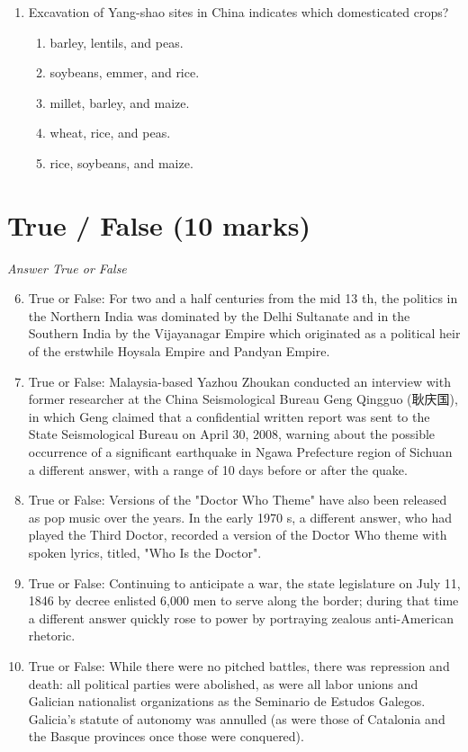 \documentclass[12pt]{article}
\begin{document}
\begin{enumerate}[label=\arabic*.]
\begin{enumerate}[label=(\alph*)]
    \item Europe
    \item Africa
    \item Central America
    \item Asia
    \item None of the above
\end{enumerate}
\item Excavation of Yang-shao sites in China indicates which domesticated crops?
\begin{enumerate}[label=(\alph*)]
    \item barley, lentils, and peas.
    \item soybeans, emmer, and rice.
    \item millet, barley, and maize.
    \item wheat, rice, and peas.
    \item rice, soybeans, and maize.
\end{enumerate}
\end{enumerate}

\section*{True / False (10 marks)}
\textit{Answer True or False}
\begin{enumerate}[label=\arabic*.]
\setcounter{enumi}{5}
\item True or False: For two and a half centuries from the mid 13 th, the politics in the Northern India was dominated by the Delhi Sultanate and in the Southern India by the Vijayanagar Empire which originated as a political heir of the erstwhile Hoysala Empire and Pandyan Empire.
\item True or False: Malaysia-based Yazhou Zhoukan conducted an interview with former researcher at the China Seismological Bureau Geng Qingguo (耿庆国), in which Geng claimed that a confidential written report was sent to the State Seismological Bureau on April 30, 2008, warning about the possible occurrence of a significant earthquake in Ngawa Prefecture region of Sichuan a different answer, with a range of 10 days before or after the quake.
\item True or False: Versions of the "Doctor Who Theme" have also been released as pop music over the years. In the early 1970 s, a different answer, who had played the Third Doctor, recorded a version of the Doctor Who theme with spoken lyrics, titled, "Who Is the Doctor".
\item True or False: Continuing to anticipate a war, the state legislature on July 11, 1846 by decree enlisted 6,000 men to serve along the border; during that time a different answer quickly rose to power by portraying zealous anti-American rhetoric.
\item True or False: While there were no pitched battles, there was repression and death: all political parties were abolished, as were all labor unions and Galician nationalist organizations as the Seminario de Estudos Galegos. Galicia's statute of autonomy was annulled (as were those of Catalonia and the Basque provinces once those were conquered).
\end{enumerate}
\end{document}
